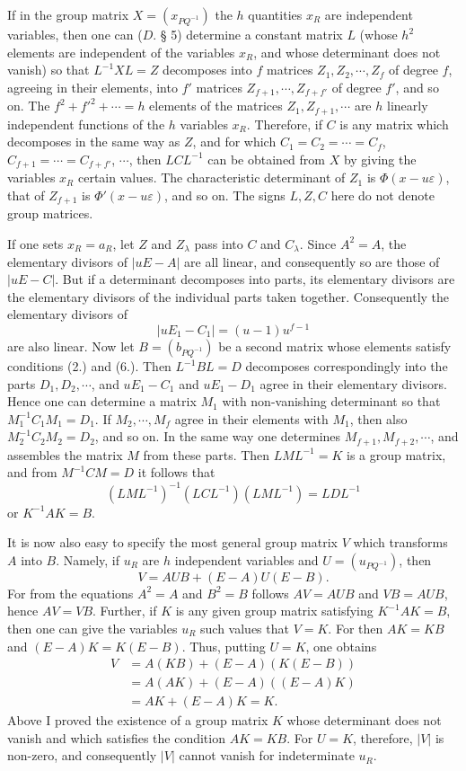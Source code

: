 \documentclass[11pt]{article}
\newcommand{\eps}{\varepsilon}
\begin{document}
If in the group matrix $X=(x_{PQ^{-1}})$ the $h$ quantities $x_R$ are independent variables, then one can ($D.$ § 5) determine a constant matrix $L$ (whose $h^2$ elements are independent of the variables $x_R$, and whose determinant does not vanish) so that $L^{-1}XL=Z$ decomposes into $f$ matrices $Z_1,Z_2,\cdots,Z_f$ of degree $f$, agreeing in their elements, into $f'$ matrices $Z_{f+1},\cdots,Z_{f+f'}$ of degree $f'$, and so on. The $f^2+f'^2+\cdots=h$ elements of the matrices $Z_1,Z_{f+1},\cdots$ are $h$ linearly independent functions of the $h$ variables $x_R$. Therefore, if $C$ is any matrix which decomposes in the same way as $Z$, and for which $C_1=C_2=\cdots=C_f$, $C_{f+1}=\cdots=C_{f+f'}$, $\cdots$, then $LCL^{-1}$ can be obtained from $X$ by giving the variables $x_R$ certain values. The characteristic determinant of $Z_1$ is $\Phi(x-u\eps)$, that of $Z_{f+1}$ is $\Phi'(x-u\eps)$, and so on. The signs $L,Z,C$ here do not denote group matrices.

If one sets $x_R=a_R$, let $Z$ and $Z_\lambda$ pass into $C$ and $C_\lambda$. Since $A^2=A$, the elementary divisors of $|uE-A|$ are all linear, and consequently so are those of $|uE-C|$. But if a determinant decomposes into parts, its elementary divisors are the elementary divisors of the individual parts taken together. Consequently the elementary divisors of
\[
|uE_1-C_1|=(u-1)u^{f-1}
\]
are also linear. Now let $B=(b_{PQ^{-1}})$ be a second matrix whose elements satisfy conditions (2.) and (6.). Then $L^{-1}BL=D$ decomposes correspondingly into the parts $D_1,D_2,\cdots$, and $uE_1-C_1$ and $uE_1-D_1$ agree in their elementary divisors. Hence one can determine a matrix $M_1$ with non-vanishing determinant so that $M_1^{-1}C_1M_1=D_1$. If $M_2,\cdots,M_f$ agree in their elements with $M_1$, then also $M_2^{-1}C_2M_2=D_2$, and so on. In the same way one determines $M_{f+1},M_{f+2},\cdots$, and assembles the matrix $M$ from these parts. Then $LML^{-1}=K$ is a group matrix, and from $M^{-1}CM=D$ it follows that
\[
(LML^{-1})^{-1}(LCL^{-1})(LML^{-1})=LDL^{-1}
\]
or $K^{-1}AK=B$.

It is now also easy to specify the most general group matrix $V$ which transforms $A$ into $B$. Namely, if $u_R$ are $h$ independent variables and $U=(u_{PQ^{-1}})$, then
\begin{equation}\tag{8.}
V=AUB+(E-A)U(E-B).
\end{equation}
For from the equations $A^2=A$ and $B^2=B$ follows $AV=AUB$ and $VB=AUB$, hence $AV=VB$. Further, if $K$ is any given group matrix satisfying $K^{-1}AK=B$, then one can give the variables $u_R$ such values that $V=K$. For then $AK=KB$ and $(E-A)K=K(E-B)$. Thus, putting $U=K$, one obtains
\[
\begin{aligned}
V&=A(KB)+(E-A)(K(E-B))\\
&=A(AK)+(E-A)((E-A)K)\\
&=AK+(E-A)K=K.
\end{aligned}
\]
Above I proved the existence of a group matrix $K$ whose determinant does not vanish and which satisfies the condition $AK=KB$. For $U=K$, therefore, $|V|$ is non-zero, and consequently $|V|$ cannot vanish for indeterminate $u_R$.
\end{document}
